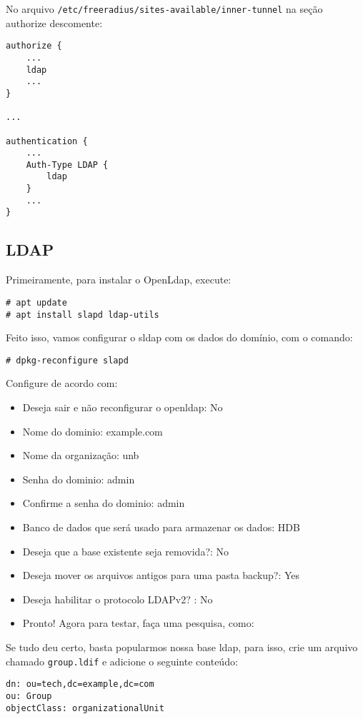 No arquivo \verb|/etc/freeradius/sites-available/inner-tunnel| na seção authorize descomente:

\begin{verbatim}
authorize {
    ...
    ldap
    ...
}

...

authentication {
    ...
    Auth-Type LDAP {
        ldap
    }
    ...
}
\end{verbatim}


\subsection{LDAP}

Primeiramente, para instalar o OpenLdap, execute:
\begin{verbatim}
# apt update
# apt install slapd ldap-utils
\end{verbatim}

Feito isso, vamos configurar o sldap com os dados do domínio, com o comando:

\begin{verbatim}
# dpkg-reconfigure slapd
\end{verbatim}

Configure de acordo com:
\begin{itemize}
    \item Deseja sair e não reconfigurar o openldap: No
    \item Nome do dominio: example.com
    \item Nome da organização: unb
    \item Senha do dominio: admin
    \item Confirme a senha do dominio: admin
    \item Banco de dados que será usado para armazenar os dados: HDB
    \item Deseja que a base existente seja removida?: No
    \item Deseja mover os arquivos antigos para uma pasta backup?: Yes
    \item Deseja habilitar o protocolo LDAPv2? : No
    \item Pronto! Agora para testar, faça uma pesquisa, como:
\end{itemize}

Se tudo deu certo, basta popularmos nossa base ldap, para isso, crie um arquivo
chamado \verb|group.ldif| e adicione o seguinte conteúdo:
\begin{verbatim}
dn: ou=tech,dc=example,dc=com
ou: Group
objectClass: organizationalUnit
\end{verbatim}

